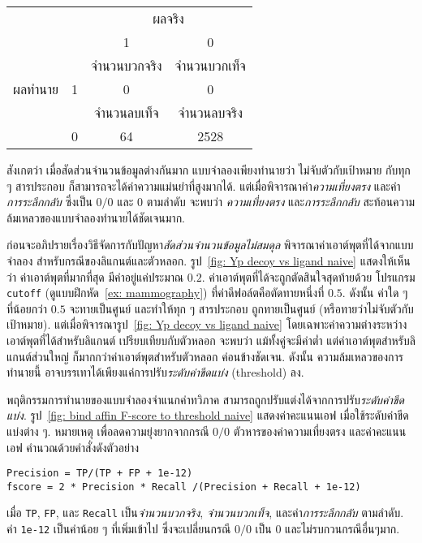 \begin{Exercise}
\begin{center}
\begin{tabular}{cccc}
		&       & \multicolumn{2}{c}{ผลจริง} \\
		&       & 1              &   0      \\
		\cline{3-4}        
		&       & \multicolumn{1}{|c}{จำนวนบวกจริง} & \multicolumn{1}{|c|}{จำนวนบวกเท็จ}  \\
		ผลทำนาย   &     1 & \multicolumn{1}{|c}{0} & \multicolumn{1}{|c|}{0} \\
		\cline{3-4}
		&      & \multicolumn{1}{|c}{จำนวนลบเท็จ} & \multicolumn{1}{|c|}{จำนวนลบจริง} \\
		&     0 & \multicolumn{1}{|c}{64} & \multicolumn{1}{|c|}{2528} \\         
		\cline{3-4}
	\end{tabular} 
\end{center}

สังเกตว่า เมื่อสัดส่วนจำนวนข้อมูลต่างกันมาก
แบบจำลองเพียงทำนายว่า ไม่จับตัวกับเป้าหมาย กับทุก ๆ สารประกอบ ก็สามารถจะได้ค่าความแม่นยำที่สูงมากได้.
แต่เมื่อพิจารณาค่า\textit{ความเที่ยงตรง}
และค่า\textit{การระลึกกลับ}
ซึ่งเป็น $0/0$ และ $0$ ตามลำดับ
จะพบว่า \textit{ความเที่ยงตรง}
และ\textit{การระลึกกลับ}
สะท้อนความล้มเหลวของแบบจำลองทำนายได้ชัดเจนมาก.

ก่อนจะอภิปรายเรื่องวิธีจัดการกับปัญหา\textit{สัดส่วนจำนวนข้อมูลไม่สมดุล}
พิจารณาค่าเอาต์พุตที่ได้จากแบบจำลอง สำหรับกรณีของลิแกนต์และตัวหลอก.
รูป~\ref{fig: Yp decoy vs ligand naive}
แสดงให้เห็นว่า ค่าเอาต์พุตที่มากที่สุด มีค่าอยู่แค่ประมาณ $0.2$.
ค่าเอาต์พุตที่ได้จะถูกตัดสินใจสุดท้ายด้วย
โปรแกรม \verb|cutoff| (ดูแบบฝึกหัด~\ref{ex: mammography}) ที่ค่าดีฟอล์ตคือตัดทายหนึ่งที่ $0.5$.
ดังนั้น ค่าใด ๆ ที่น้อยกว่า $0.5$ จะทายเป็นศูนย์ และทำให้ทุก ๆ สารประกอบ ถูกทายเป็นศูนย์ (หรือทายว่าไม่จับตัวกับเป้าหมาย).
แต่เมื่อพิจารณารูป~\ref{fig: Yp decoy vs ligand naive}
โดยเฉพาะค่าความต่างระหว่างเอาต์พุตที่ได้สำหรับลิแกนต์ เปรียบเทียบกับตัวหลอก
จะพบว่า แม้ทั้งคู่จะมีค่าต่ำ แต่ค่าเอาต์พุตสำหรับลิแกนต์ส่วนใหญ่ ก็มากกว่าค่าเอาต์พุตสำหรับตัวหลอก ค่อนข้างชัดเจน.
ดังนั้น ความล้มเหลวของการทำนายนี้ อาจบรรเทาได้เพียงแค่การปรับ\textit{ระดับค่าขีดแบ่ง} (threshold) ลง.

พฤติกรรมการทำนายของแบบจำลองจำแนกค่าทวิภาค สามารถถูกปรับแต่งได้จากการปรับ\textit{ระดับค่าขีดแบ่ง}.
รูป~\ref{fig: bind affin F-score to threshold naive} แสดงค่าคะแนนเอฟ เมื่อใช้ระดับค่าขีดแบ่งต่าง ๆ.
หมายเหตุ เพื่อลดความยุ่งยากจากกรณี $0/0$
ตัวหารของค่าความเที่ยงตรง และค่าคะแนนเอฟ คำนวณด้วยคำสั่งดังตัวอย่าง
\begin{Verbatim}[fontsize=\small]
Precision = TP/(TP + FP + 1e-12)
fscore = 2 * Precision * Recall /(Precision + Recall + 1e-12)
\end{Verbatim}
เมื่อ \verb|TP|, \verb|FP|, และ \verb|Recall| เป็น\textit{จำนวนบวกจริง},
\textit{จำนวนบวกเท็จ},
และค่า\textit{การระลึกกลับ} ตามลำดับ.
ค่า \verb|1e-12| เป็นค่าน้อย ๆ ที่เพิ่มเข้าไป ซึ่งจะเปลี่ยนกรณี $0/0$ เป็น $0$ และไม่รบกวนกรณีอื่นๆมาก.


\end{Exercise}
